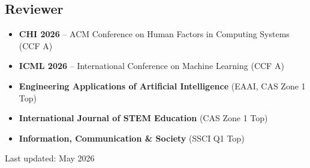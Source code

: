 \documentclass[a4paper,10pt]{article}
\begin{document}
\subsection*{Reviewer}
\begin{itemize}
  \item \textbf{CHI 2026} -- ACM Conference on Human Factors in Computing Systems (CCF A)
  \item \textbf{ICML 2026} -- International Conference on Machine Learning (CCF A)
  \item \textbf{Engineering Applications of Artificial Intelligence} (EAAI, CAS Zone 1 Top)
  \item \textbf{International Journal of STEM Education} (CAS Zone 1 Top)
  \item \textbf{Information, Communication \& Society} (SSCI Q1 Top)
\end{itemize}

\vfill
\begin{center}
  \small\color{cvgray} Last updated: May 2026
\end{center}
\end{document}
